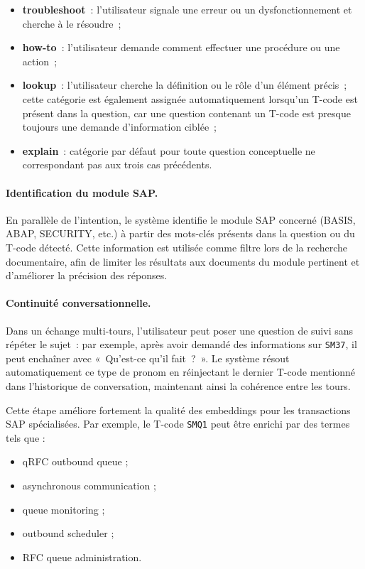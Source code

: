 \begin{itemize}
  \item \textbf{troubleshoot}~: l’utilisateur signale une erreur ou un dysfonctionnement et cherche à le résoudre~;
  \item \textbf{how-to}~: l’utilisateur demande comment effectuer une procédure ou une action~;
  \item \textbf{lookup}~: l’utilisateur cherche la définition ou le rôle d’un élément précis~; cette catégorie est également assignée automatiquement lorsqu’un T-code est présent dans la question, car une question contenant un T-code est presque toujours une demande d’information ciblée~;
  \item \textbf{explain}~: catégorie par défaut pour toute question conceptuelle ne correspondant pas aux trois cas précédents.
\end{itemize}

\paragraph{Identification du module SAP.}
En parallèle de l’intention, le système identifie le module SAP concerné (BASIS, ABAP, SECURITY, etc.) à partir des mots-clés présents dans la question ou du T-code détecté. Cette information est utilisée comme filtre lors de la recherche documentaire, afin de limiter les résultats aux documents du module pertinent et d’améliorer la précision des réponses.

\paragraph{Continuité conversationnelle.}
Dans un échange multi-tours, l’utilisateur peut poser une question de suivi sans répéter le sujet~: par exemple, après avoir demandé des informations sur \texttt{SM37}, il peut enchaîner avec «~Qu’est-ce qu’il fait~?~». Le système résout automatiquement ce type de pronom en réinjectant le dernier T-code mentionné dans l’historique de conversation, maintenant ainsi la cohérence entre les tours.

Cette étape améliore fortement la qualité des embeddings pour les transactions SAP spécialisées. Par exemple, le T-code \texttt{SMQ1} peut être enrichi par des termes tels que :

\begin{itemize}
    \item qRFC outbound queue ;
    \item asynchronous communication ;
    \item queue monitoring ;
    \item outbound scheduler ;
    \item RFC queue administration.
\end{itemize}

